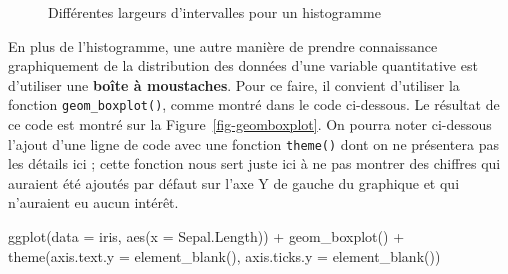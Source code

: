 \documentclass[
  letterpaper,
]{book}
\newenvironment{Shaded}{\begin{snugshade}}{\end{snugshade}}
\newcommand{\AttributeTok}[1]{\textcolor[rgb]{0.40,0.45,0.13}{#1}}
\newcommand{\FunctionTok}[1]{\textcolor[rgb]{0.28,0.35,0.67}{#1}}
\newcommand{\NormalTok}[1]{\textcolor[rgb]{0.00,0.23,0.31}{#1}}
\newcommand{\SpecialCharTok}[1]{\textcolor[rgb]{0.37,0.37,0.37}{#1}}
\begin{document}
\begin{figure}


\caption{\label{fig-geomhistogramVariedBinwidth2}Différentes largeurs
d'intervalles pour un histogramme}

\end{figure}%

En plus de l'histogramme, une autre manière de prendre connaissance
graphiquement de la distribution des données d'une variable quantitative
est d'utiliser une \textbf{boîte à moustaches}. Pour ce faire, il
convient d'utiliser la fonction \texttt{geom\_boxplot()}, comme montré
dans le code ci-dessous. Le résultat de ce code est montré sur la
Figure~\ref{fig-geomboxplot}. On pourra noter ci-dessous l'ajout d'une
ligne de code avec une fonction \texttt{theme()} dont on ne présentera
pas les détails ici ; cette fonction nous sert juste ici à ne pas
montrer des chiffres qui auraient été ajoutés par défaut sur l'axe Y de
gauche du graphique et qui n'auraient eu aucun intérêt.

\begin{Shaded}
\begin{Highlighting}[]
\FunctionTok{ggplot}\NormalTok{(}\AttributeTok{data =}\NormalTok{ iris, }\FunctionTok{aes}\NormalTok{(}\AttributeTok{x =}\NormalTok{ Sepal.Length)) }\SpecialCharTok{+}
  \FunctionTok{geom\_boxplot}\NormalTok{() }\SpecialCharTok{+}
  \FunctionTok{theme}\NormalTok{(}\AttributeTok{axis.text.y =} \FunctionTok{element\_blank}\NormalTok{(),}
        \AttributeTok{axis.ticks.y =} \FunctionTok{element\_blank}\NormalTok{())}
\end{Highlighting}
\end{Shaded}
\end{document}
